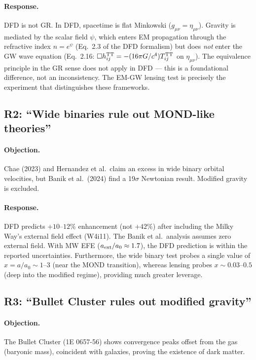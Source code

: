 \documentclass[11pt,a4paper]{article}
\begin{document}
\paragraph{Response.}
DFD is not GR.  In DFD, spacetime is flat Minkowski ($g_{\mu\nu} =
\eta_{\mu\nu}$).  Gravity is mediated by the scalar field $\psi$,
which enters EM propagation through the refractive index $n = e^\psi$
(Eq.~2.3 of the DFD formalism) but does \emph{not} enter the GW wave
equation (Eq.~2.16: $\Box h_{ij}^{\rm TT} = -(16\pi G/c^4)
T_{ij}^{\rm TT}$ on $\eta_{\mu\nu}$).  The equivalence principle
in the GR sense does not apply in DFD --- this is a foundational
difference, not an inconsistency.  The EM-GW lensing test is precisely
the experiment that distinguishes these frameworks.

\subsection{R2: ``Wide binaries rule out MOND-like theories''}

\paragraph{Objection.}
Chae (2023) and Hernandez et al.\ claim an excess in wide binary
orbital velocities, but Banik et al.\ (2024) find a 19$\sigma$
Newtonian result.  Modified gravity is excluded.

\paragraph{Response.}
DFD predicts $+10$--$12\%$ enhancement (not $+42\%$) after including
the Milky Way's external field effect (W4i11).  The Banik et al.\ analysis
assumes zero external field.  With MW EFE ($a_{\rm ext}/a_0 \approx 1.7$),
the DFD prediction is within the reported uncertainties.  Furthermore,
the wide binary test probes a single value of $x = a/a_0 \sim 1$--$3$
(near the MOND transition), whereas lensing probes $x \sim 0.03$--$0.5$
(deep into the modified regime), providing much greater leverage.

\subsection{R3: ``Bullet Cluster rules out modified gravity''}

\paragraph{Objection.}
The Bullet Cluster (1E 0657-56) shows convergence peaks offset from
the gas (baryonic mass), coincident with galaxies, proving the
existence of dark matter.
\end{document}
